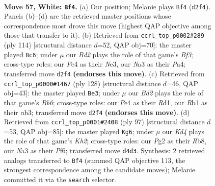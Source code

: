 \documentclass[11pt]{article}
\begin{document}
\clearpage

\begin{figure}[p]\centering
\begin{subfigure}{0.46\textwidth}\centering
\resizebox{\linewidth}{!}{%
\newchessgame
\chessboard[
  setfen={7r/pn6/1pr1p1kp/8/2PKP3/N7/P2B2PR/1R6 w - - 7 57},
  showmover=false,
  pgfstyle=straightmove, color=movearrow, markmove={d2-f4}
]}
\caption{}
\end{subfigure}\hfill
\begin{subfigure}{0.46\textwidth}\centering
\resizebox{\linewidth}{!}{%
\newchessgame
\chessboard[
  setfen={8/p2b4/1p5k/1Pp1p1rp/P1P5/3KNB2/8/7R w - - 5 58},
  showmover=false,
  pgfstyle=straightmove, color=movearrow, markmove={f3-c6}
]}
\caption{}
\end{subfigure}
\\[4pt]
\begin{subfigure}{0.46\textwidth}\centering
\resizebox{\linewidth}{!}{%
\newchessgame
\chessboard[
  setfen={r7/8/1B2k1p1/p2p1r2/2p2P2/1nP4P/R5PK/3R4 w - - 1 65},
  showmover=false,
  pgfstyle=straightmove, color=movearrow, markmove={b6-e3}
]}
\caption{}
\end{subfigure}\hfill
\begin{subfigure}{0.46\textwidth}\centering
\resizebox{\linewidth}{!}{%
\newchessgame
\chessboard[
  setfen={1r6/2R3pk/1r3p2/4pn1p/7P/1P4P1/1R1N1PK1/8 b - - 40 49},
  showmover=false,
  pgfstyle=straightmove, color=movearrow, markmove={h7-g6}
]}
\caption{}
\end{subfigure}
\caption{\textbf{Move 57, White: \texttt{Bf4}.} (a) Our position; Melanie plays \texttt{Bf4} (\texttt{d2f4}). Panels (b)--(d) are the retrieved master positions whose correspondence most drove this move (highest QAP objective among those that transfer to it). (b) Retrieved from \texttt{ccrl\_top\_p0002\#289} (ply 114) [structural distance $d$=52, QAP obj=70]: the master played \texttt{Bc6}; under $\mu$ our \emph{Bd2} plays the role of that game's \emph{Bf3}; cross-type roles: our \emph{P}e4 as their \emph{N}e3, our \emph{N}a3 as their \emph{P}a4; transferred move \texttt{d2f4} \textbf{(endorses this move)}. (c) Retrieved from \texttt{ccrl\_top\_p0000\#1467} (ply 128) [structural distance $d$=46, QAP obj=43]: the master played \texttt{Be3}; under $\mu$ our \emph{Bd2} plays the role of that game's \emph{Bb6}; cross-type roles: our \emph{P}e4 as their \emph{R}d1, our \emph{R}b1 as their \emph{n}b3; transferred move \texttt{d2f4} \textbf{(endorses this move)}. (d) Retrieved from \texttt{ccrl\_top\_p0001\#2408} (ply 97) [structural distance $d$=53, QAP obj=85]: the master played \texttt{Kg6}; under $\mu$ our \emph{Kd4} plays the role of that game's \emph{Kh2}; cross-type roles: our \emph{P}g2 as their \emph{R}b8, our \emph{N}a3 as their \emph{P}f6; transferred move \texttt{d4d3}. Synthesis: 2 retrieved analogs transferred to \texttt{Bf4} (summed QAP objective 113, the strongest correspondence among the candidate moves); Melanie committed it via the \texttt{search} selector.}
\label{fig:thought-m112}
\end{figure}
\end{document}

